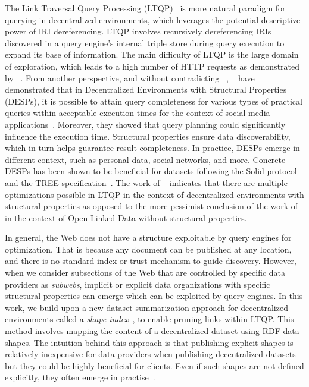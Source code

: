 The Link Traversal Query Processing (LTQP)~\cite{Hartig2012} is more natural paradigm for querying in decentralized environments,
which leverages the potential descriptive power of IRI dereferencing.
LTQP involves recursively dereferencing IRIs discovered in a query engine's internal triple store during query execution to expand its base of information.
The main difficulty of LTQP is the large domain of exploration, which leads to a high number of HTTP requests as demonstrated by \citeauthor{hartig2016walking}~\cite{hartig2016walking}.
From another perspective, and without contradicting \citeauthor{hartig2016walking}~\cite{hartig2016walking}, \citeauthor{Taelman2023}~\cite{Taelman2023} have demonstrated that in Decentralized Environments with Structural Properties (DESPs), it is possible to attain query completeness for various types of practical queries within acceptable execution times for the context of social media applications~\cite{nielsen1993response}.
Moreover, they showed that query planning could significantly influence the execution time.
Structural properties ensure data discoverability, which in turn helps guarantee result completeness.
In practice, DESPs emerge in different context, such as personal data, social networks, and more.
Concrete DESPs has been shown to be beneficial for datasets following the Solid protocol~\cite{Taelman2023} and the TREE specification~\cite{tam_iswc_traversalsensortree_2024}.
The work of \citeauthor{Taelman2023}~\cite{Taelman2023} indicates that there are multiple optimizations possible in LTQP in the context of decentralized environments with structural properties as opposed to the
more pessimist conclusion of the work of \citeauthor{hartig2016walking}~\cite{hartig2016walking} in the context of Open Linked Data without structural properties.

In general, the Web does not have a structure exploitable by query engines for optimization.
That is because any document can be published at any location, and there is no standard index or trust mechanism to guide discovery.
However, when we consider subsections of the Web that are controlled by specific data providers as \emph{subwebs},
implicit or explicit data organizations with specific structural properties can emerge
which can be exploited by query engines.
In this work, we build upon a new dataset summarization approach for decentralized environments called a \emph{shape index}~\cite{tam2024opportunitiesshapebasedoptimizationlink},
to enable pruning links within LTQP.
This method involves mapping the content of a decentralized dataset using RDF data shapes.
The intuition behind this approach is that publishing explicit shapes is relatively inexpensive for data providers when publishing decentralized datasets but they could be highly beneficial for clients.
Even if such shapes are not defined explicitly, they often emerge in practise~\cite{Neumann2011CharacteristicSA}.

